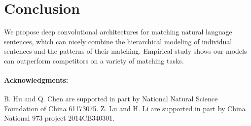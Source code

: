 \documentclass{article} \usepackage{nips14submit_e,times}
\newcommand{\0}{\ensuremath{\mathbf{0}}}
\newcommand{\1}{\ensuremath{\mathbf{1}}}
\begin{document}
\section{Conclusion}\vspace{-10pt}
We propose deep convolutional architectures for matching natural language sentences, which can nicely combine the hierarchical modeling of individual sentences and the patterns of their matching. Empirical study shows our models can outperform competitors on a variety of matching tasks.


\paragraph{Acknowledgments:}{\small B. Hu and Q. Chen are supported in part by National Natural Science Foundation of China 61173075.  Z. Lu and H. Li are supported in part  by China National 973 project 2014CB340301.}
\vspace{-10pt}

\small{}
\end{document}
